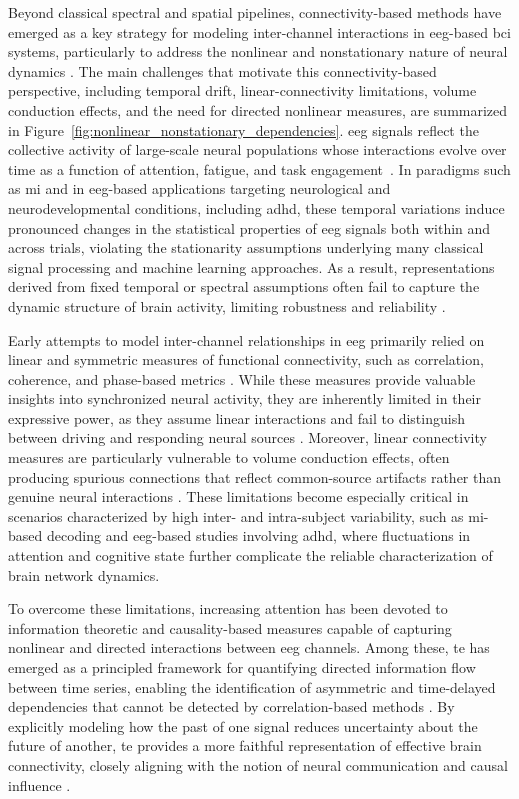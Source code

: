 Beyond classical spectral and spatial pipelines, connectivity-based methods have emerged as a key strategy for modeling inter-channel interactions in \gls{eeg}-based \gls{bci} systems, particularly to address the nonlinear and nonstationary nature of neural dynamics \cite{shoka2019literature,singh2021comprehensive}. {The main challenges that motivate this connectivity-based perspective, including temporal drift, linear-connectivity limitations, volume conduction effects, and the need for directed nonlinear measures, are summarized in Figure~\ref{fig:nonlinear_nonstationary_dependencies}.} {\gls{eeg} signals reflect the collective activity of large-scale neural populations whose interactions evolve over time as a function of attention, fatigue, and task engagement~\cite{wang2019eeg}.} In paradigms such as \gls{mi} and in \gls{eeg}-based applications targeting neurological and neurodevelopmental conditions, including \gls{adhd}, these temporal variations induce pronounced changes in the statistical properties of \gls{eeg} signals both within and across trials, violating the stationarity assumptions underlying many classical signal processing and machine learning approaches. As a result, representations derived from fixed temporal or spectral assumptions often fail to capture the dynamic structure of brain activity, limiting robustness and reliability \cite{singh2021comprehensive}.

Early attempts to model inter-channel relationships in \gls{eeg} primarily relied on linear and symmetric measures of functional connectivity, such as correlation, coherence, and phase-based metrics \cite{pereda2005nonlinear}. While these measures provide valuable insights into synchronized neural activity, they are inherently limited in their expressive power, as they assume linear interactions and fail to distinguish between driving and responding neural sources \cite{bastos2016tutorial}. Moreover, linear connectivity measures are particularly vulnerable to volume conduction effects, often producing spurious connections that reflect common-source artifacts rather than genuine neural interactions \cite{nunez1997eeg,vinck2011improved}. These limitations become especially critical in scenarios characterized by high inter- and intra-subject variability, such as \gls{mi}-based decoding and \gls{eeg}-based studies involving \gls{adhd}, where fluctuations in attention and cognitive state further complicate the reliable characterization of brain network dynamics.

To overcome these limitations, increasing attention has been devoted to information theoretic and causality-based measures capable of capturing nonlinear  and directed interactions between \gls{eeg} channels. Among these, \gls{te} has emerged as a principled framework for quantifying directed information flow between time series, enabling the identification of asymmetric and time-delayed dependencies that cannot be detected by correlation-based methods \cite{staniek2008symbolic}. By explicitly modeling how the past of one signal reduces uncertainty about the future of another, \gls{te} provides a more faithful representation of effective brain connectivity, closely aligning with the notion of neural communication and causal influence \cite{bastos2016tutorial,faes2017information}.

